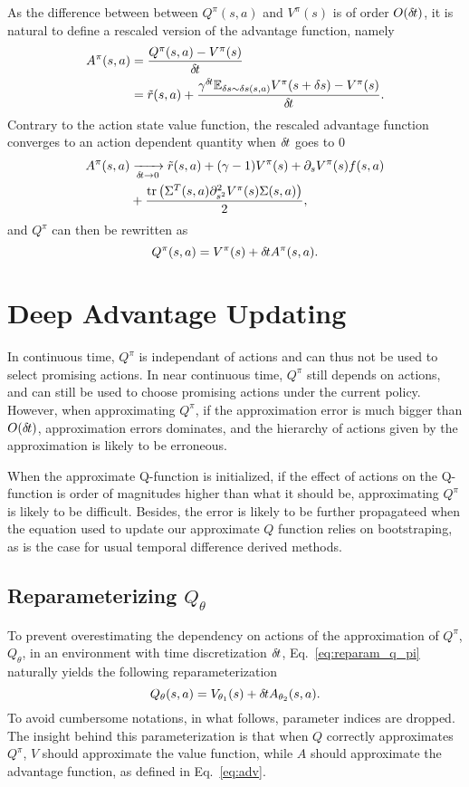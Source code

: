 \documentclass{article}
\begin{document}
As the difference between between $Q^\pi(s, a)$ and $V^\pi(s)$ is of order
$O(\delta\hspace{-.1em}t)$, it is natural to define a rescaled version of the advantage
function, namely
\begin{align}
	A^\pi(s, a) &= \frac{Q^\pi(s,a) - V^\pi(s)}{\delta\hspace{-.1em}t}\\
		    &= \tilde{r}(s, a) +
		    \frac{\gamma^{\delta\hspace{-.1em}t} \mathbb{E}_{\delta s \sim \delta s(s, a)} V^\pi(s + \delta s) - V^\pi(s)}{\delta\hspace{-.1em}t}.
    \label{eq:adv}
\end{align}
Contrary to the action state value function, the rescaled advantage function converges
to an action dependent quantity when $\delta\hspace{-.1em}t$ goes to $0$
\begin{align}
	A^\pi(s, a) &\xrightarrow[\delta\hspace{-.1em}t \to 0]{} \tilde{r}(s, a) +
	(\gamma - 1) V^\pi(s) + \partial_s V^\pi(s) f(s, a)\nonumber\\
		    &+
	\frac{\text{tr}\left(\Sigma^T(s, a)\partial^2_{s^2}V^\pi(s) \Sigma(s,a)\right)}{2},
\end{align}
and $Q^\pi$ can then be rewritten as
\begin{equation}
	Q^\pi(s, a) = V^\pi(s) + \delta\hspace{-.1em}t A^\pi(s, a).
	\label{eq:reparam_q_pi}
\end{equation}

\section{Deep Advantage Updating}
In continuous time, $Q^\pi$ is independant of actions and can thus not be used
to select promising actions.  In near continuous time, $Q^\pi$ still depends on
actions, and can still be used to choose promising actions under the current
policy. However, when approximating $Q^\pi$, if the approximation error is much
bigger than $O(\delta\hspace{-.1em}t)$, approximation errors dominates, and the hierarchy
of actions given by the approximation is likely to be erroneous.

When the approximate Q-function is initialized, if the effect of actions on the
Q-function is order of magnitudes higher than what it should be, approximating
$Q^\pi$ is likely to be difficult. Besides, the error is likely to be further
propagateed when the equation used to update our approximate $Q$ function
relies on bootstraping, as is the case for usual temporal difference derived methods.

\subsection{Reparameterizing $Q_\theta$}
\label{subsec:reparam}
To prevent overestimating the dependency on actions of the approximation of
$Q^\pi$, $Q_\theta$, in an environment with time discretization $\delta\hspace{-.1em}t$,
Eq.~\eqref{eq:reparam_q_pi} naturally yields the following reparameterization
\begin{equation}
	Q_\theta(s, a) = V_{\theta_1}(s) + \delta\hspace{-.1em}t A_{\theta_2}(s, a).
\end{equation}
To avoid cumbersome notations, in what follows, parameter indices are dropped.
The insight behind this parameterization is that when $Q$ correctly
approximates $Q^\pi$, $V$ should approximate the value function, while $A$
should approximate the advantage function, as defined in Eq.~\eqref{eq:adv}.
\end{document}
